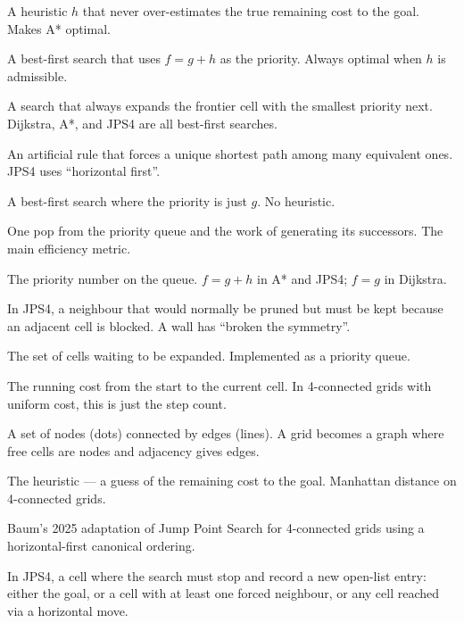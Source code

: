 \documentclass[11pt,a4paper]{article}
\begin{document}
\begin{description}[leftmargin=130pt, style=nextline]
  \item[\textbf{Admissible heuristic}] A heuristic $h$ that never over-estimates the true remaining cost to the goal. Makes A* optimal.
  \item[\textbf{A*}] A best-first search that uses $f = g + h$ as the priority. Always optimal when $h$ is admissible.
  \item[\textbf{Best-first search}] A search that always expands the frontier cell with the smallest priority next. Dijkstra, A*, and JPS4 are all best-first searches.
  \item[\textbf{Canonical ordering}] An artificial rule that forces a unique shortest path among many equivalent ones. JPS4 uses ``horizontal first''.
  \item[\textbf{Dijkstra's algorithm}] A best-first search where the priority is just $g$. No heuristic.
  \item[\textbf{Expansion}] One pop from the priority queue and the work of generating its successors. The main efficiency metric.
  \item[\textbf{$f$}] The priority number on the queue. $f = g + h$ in A* and JPS4; $f = g$ in Dijkstra.
  \item[\textbf{Forced neighbour}] In JPS4, a neighbour that would normally be pruned but must be kept because an adjacent cell is blocked. A wall has ``broken the symmetry''.
  \item[\textbf{Frontier} (open list)] The set of cells waiting to be expanded. Implemented as a priority queue.
  \item[\textbf{$g$}] The running cost from the start to the current cell. In 4-connected grids with uniform cost, this is just the step count.
  \item[\textbf{Graph}] A set of nodes (dots) connected by edges (lines). A grid becomes a graph where free cells are nodes and adjacency gives edges.
  \item[\textbf{$h$}] The heuristic --- a guess of the remaining cost to the goal. Manhattan distance on 4-connected grids.
  \item[\textbf{Horizontal-first JPS (HJPS/JPS4)}] Baum's 2025 adaptation of Jump Point Search for 4-connected grids using a horizontal-first canonical ordering.
  \item[\textbf{Jump point}] In JPS4, a cell where the search must stop and record a new open-list entry: either the goal, or a cell with at least one forced neighbour, or any cell reached via a horizontal move.

\end{description}
\end{document}
